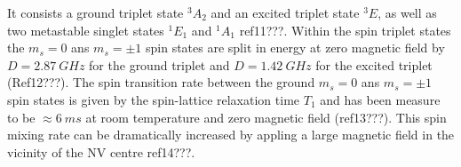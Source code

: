 \documentclass[preprint,prl,twocolumn]{revtex4}
\begin{document}
It consists a ground triplet state $^3A_2$ and an excited triplet state $^3E$, as well as two metastable singlet states $^1E_1$ and $^1A_1$ ref11???. Within the spin triplet states the $m_s = 0$ ans $m_s = \pm1$ spin states are split in energy at zero magnetic field by $D=\SI{2.87}{GHz}$ for the ground triplet and $D=\SI{1.42}{GHz}$ for the excited triplet (Ref12???). The spin transition rate between the ground $m_s = 0$ ans $m_s = \pm1$ spin states is given by the spin-lattice relaxation time $T_1$ and has been measure to be $\approx\SI{6}{ms}$ at room temperature and zero magnetic field (ref13???). This spin mixing rate can be dramatically increased by appling a large magnetic field in the vicinity of the NV centre ref14???.

 
\end{document}
